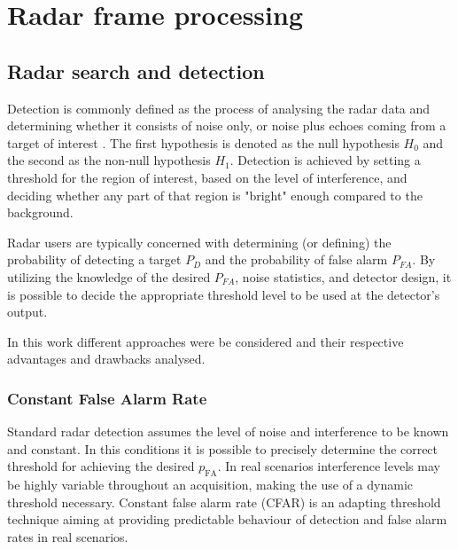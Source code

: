 \chapter{Radar frame processing}
\label{chap:radar_detection}

\section{Radar search and detection}
Detection is commonly defined as the process of analysing the radar data and determining whether it consists of noise only, or noise plus echoes coming from a target of interest \cite{Richards_Scheer_Holm_2010}. 
The first hypothesis is denoted as the null hypothesis $H_0$ and the second as the non-null hypothesis $H_1$.
Detection is achieved by setting a threshold for the region of interest, based on the level of interference, and deciding whether any part of that region is "bright" enough compared to the background.


Radar users are typically concerned with determining (or defining) the probability of detecting a target $P_D$ and the probability of false alarm $P_{FA}$.  By utilizing the knowledge of the desired $P_{FA}$, noise statistics, and detector design, it is possible to decide the appropriate threshold level to be used at the detector's output.





In this work different approaches were be considered and their respective advantages and drawbacks analysed. 



\subsection{Constant False Alarm Rate}
	
	Standard radar detection assumes the level of noise and interference to be known and constant. In this conditions it is possible to precisely determine the correct threshold for achieving the desired $	p_\text{FA}$. In real scenarios interference levels may be highly variable throughout an acquisition, making the use of a dynamic threshold necessary. Constant false alarm rate (CFAR) is an adapting threshold technique aiming at providing predictable behaviour of detection and false alarm rates in real scenarios.
	
